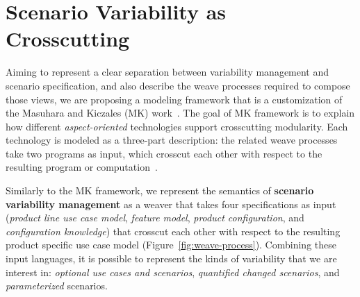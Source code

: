 \documentclass{llncs}
\begin{document}


\section{Scenario Variability as Crosscutting}
\label{sec:models}

Aiming to represent a clear separation between variability management and scenario specification, and also 
describe the weave processes required to compose those views, we are proposing a modeling framework that is a 
customization of the Masuhara and Kiczales (MK) work~\cite{kiczales-ecoop-2003}. The goal of MK framework is to
explain how different \emph{aspect-oriented} technologies support crosscutting modularity. Each technology is modeled 
as a three-part description: the related weave processes take two programs as input, which crosscut each other with respect 
to the resulting program or computation~\cite{kiczales-ecoop-2003}. 

Similarly to the MK framework, we represent the semantics of \textbf{scenario variability management} as a weaver that takes four specifications
as input (\emph{product line use case model}, \emph{feature model}, \emph{product configuration}, and \emph{configuration knowledge}) that 
crosscut each other with respect to the resulting product specific use case model (Figure~\ref{fig:weave-process}). Combining these input languages, 
it is possible to represent the kinds of variability that we are interest in: \emph{optional use cases and scenarios}, \emph{quantified changed scenarios}, 
and \emph{parameterized} scenarios. 
\end{document}
